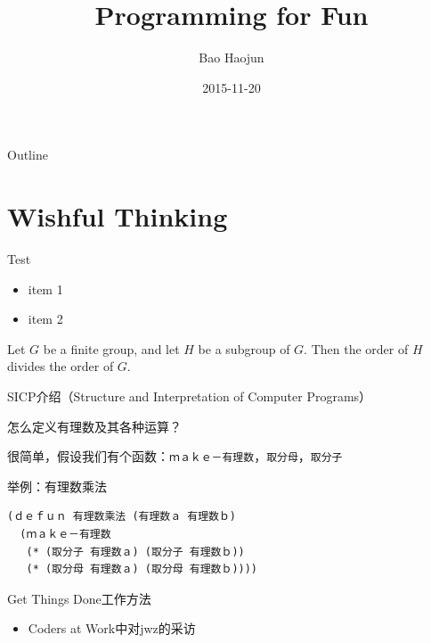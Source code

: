 \documentclass[presentation,dvipdfmx,CJKbookmarks]{beamer}
\author{Bao Haojun}
\date{2015-11-20}
\title{Programming for Fun}
\begin{document}
\begin{CJK*}{UTF8}{simsun}

\maketitle
\begin{frame}{Outline}
\tableofcontents
\end{frame}

\CJKtilde

\section{Wishful Thinking}
\label{sec:org9f81438}

\begin{frame}[label={sec:org0766301}]{Test}
\begin{itemize}[<+->]
\item item 1
\item item 2
\end{itemize}

Let \(G\) be a finite group, and let \(H\) be
a subgroup of \(G\).  Then the order of \(H\) divides the order of \(G\).
\end{frame}

\begin{frame}[fragile,label={sec:org9aeacf5}]{SICP\thinspace 介绍（Structure and Interpretation of Computer Programs）}
 \begin{block}{怎么定义有理数及其各种运算？}
\end{block}
\begin{block}{很简单，假设我们有\thinspace 个函数：\texttt{ｍａｋｅ－有理数}，\texttt{取分母}，\texttt{取分子}}
\end{block}
\begin{block}{举例：有理数乘法}
\begin{verbatim}
(ｄｅｆｕｎ 有理数乘法 (有理数ａ 有理数ｂ)
  (ｍａｋｅ－有理数
   (* (取分子 有理数ａ) (取分子 有理数ｂ))
   (* (取分母 有理数ａ) (取分母 有理数ｂ))))
\end{verbatim}
\end{block}
\end{frame}

\begin{frame}[label={sec:org97a699c}]{Get Things Done\thinspace 工作方法}
\begin{itemize}
\item Coders at Work\thinspace 中对\thinspace jwz\thinspace 的采访


\end{itemize}
\end{frame}
\end{CJK*}
\end{document}
